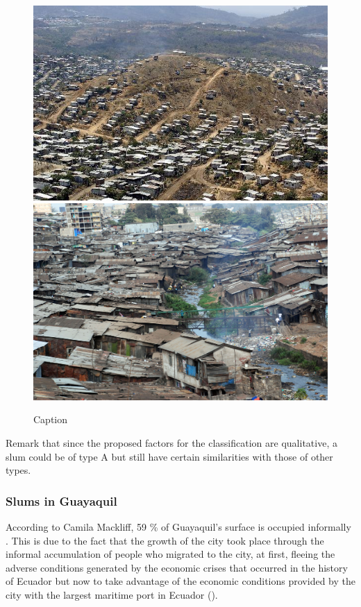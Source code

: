 \documentclass[10pt]{article}
\begin{document}
\begin{figure}[h]
    \centering
    \includegraphics[scale = 0.32]{images/slum_a}
    \includegraphics[scale = 0.205]{images/slum_d}
    \caption{Caption}
    \label{fig:my_label}
\end{figure}


Remark that since the proposed factors for the classification are qualitative, a slum could be of type A but still have certain similarities with those of other types.

\subsubsection{Slums in Guayaquil}

According to Camila Mackliff, 59 \% of Guayaquil's surface is occupied informally \cite{cam_mac}. This is due to the fact that the growth of the city took place through the informal accumulation of people who migrated to the city, at first, fleeing the adverse conditions generated by the economic crises that occurred in the history of Ecuador but now to take advantage of the economic conditions provided by the city with the largest maritime port in Ecuador ().\\
\end{document}
